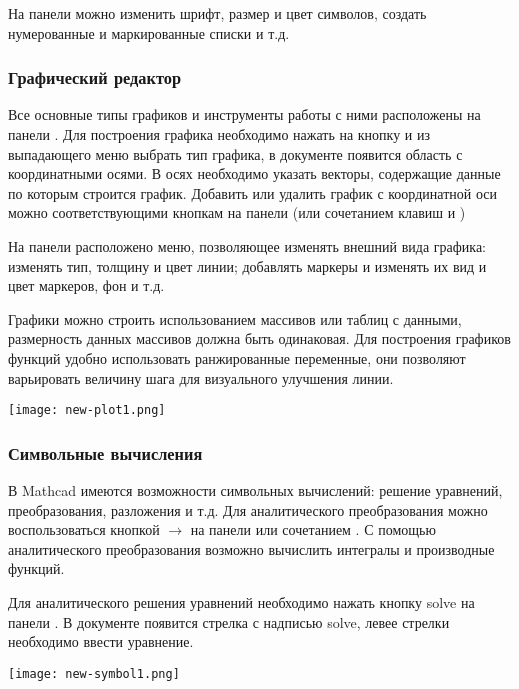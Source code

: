На панели  можно изменить шрифт, размер и цвет символов, создать нумерованные и маркированные списки и т.д.

\subsubsection*{Графический редактор}
Все основные типы графиков и инструменты работы с ними расположены на панели . Для построения графика необходимо нажать на кнопку   и из выпадающего  меню выбрать тип графика, в документе появится область с координатными осями. В осях необходимо указать векторы, содержащие данные по которым строится график. 
Добавить или удалить график с координатной оси можно соответствующими кнопкам на панели  (или сочетанием клавиш \keys{ \shift + \enter} и \keys{\del} )

На панели расположено меню, позволяющее изменять внешний вида графика: изменять тип, толщину и цвет линии; добавлять маркеры и изменять их вид и цвет маркеров, фон и т.д.

Графики можно строить использованием массивов или таблиц с данными, размерность данных массивов должна быть одинаковая. Для построения графиков функций удобно использовать ранжированные переменные, они позволяют варьировать величину шага для визуального улучшения линии.

\begin{center}
	\texttt{[image: new-plot1.png]}
\end{center}


\subsubsection*{Символьные вычисления}
В Mathcad имеются возможности символьных вычислений: решение уравнений, преобразования, разложения и т.д. Для аналитического преобразования можно воспользоваться кнопкой $\rightarrow$ на панели   или сочетанием . С помощью аналитического преобразования возможно вычислить интегралы и производные функций.

Для аналитического решения уравнений необходимо нажать кнопку solve  на панели  . В документе появится стрелка с надписью solve, левее стрелки необходимо ввести уравнение.


\begin{center}
	\texttt{[image: new-symbol1.png]}
\end{center}


